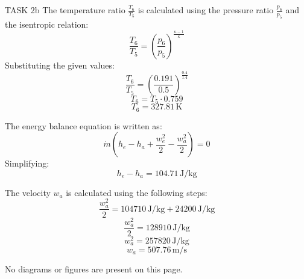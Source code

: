 TASK 2b  
The temperature ratio \( \frac{T_6}{T_5} \) is calculated using the pressure ratio \( \frac{p_6}{p_5} \) and the isentropic relation:  
\[
\frac{T_6}{T_5} = \left( \frac{p_6}{p_5} \right)^{\frac{\kappa - 1}{\kappa}}
\]  
Substituting the given values:  
\[
\frac{T_6}{T_5} = \left( \frac{0.191}{0.5} \right)^{\frac{0.4}{1.4}}
\]  
\[
T_6 = T_5 \cdot 0.759
\]  
\[
T_6 = 327.81 \, \text{K}
\]  

The energy balance equation is written as:  
\[
\dot{m} \left( h_e - h_a + \frac{w_e^2}{2} - \frac{w_a^2}{2} \right) = 0
\]  
Simplifying:  
\[
h_e - h_a = 104.71 \, \text{J/kg}
\]  

The velocity \( w_a \) is calculated using the following steps:  
\[
\frac{w_a^2}{2} = 104710 \, \text{J/kg} + 24200 \, \text{J/kg}
\]  
\[
\frac{w_a^2}{2} = 128910 \, \text{J/kg}
\]  
\[
w_a^2 = 257820 \, \text{J/kg}
\]  
\[
w_a = 507.76 \, \text{m/s}
\]  

No diagrams or figures are present on this page.